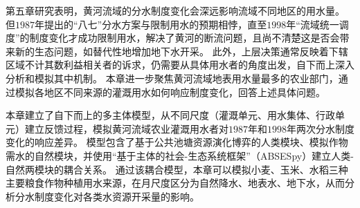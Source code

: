 第五章研究表明，黄河流域的分水制度变化会深远影响流域不同地区的用水量。
但$1987$年提出的“八七”分水方案与限制用水的预期相悖，直至$1998$年“流域统一调度”的制度变化才成功限制用水，解决了黄河的断流问题，且尚不清楚这是否会带来新的生态问题，如替代性地增加地下水开采。
此外，上层决策通常反映着下辖区域不计其数利益相关者的诉求，仍需要从具体用水者的角度出发，自下而上深入分析和模拟其中机制。
本章进一步聚焦黄河流域地表用水量最多的农业部门，通过模拟各地区不同来源的灌溉用水如何响应制度变化，回答上述具体问题。

本章建立了自下而上的多主体模型，从不同尺度（灌溉单元、用水集体、行政单元）建立反馈过程，模拟黄河流域农业灌溉用水者对$1987$年和$1998$年两次分水制度变化的响应差异。
模型包含了基于公共池塘资源演化博弈的人类模块、模拟作物需水的自然模块，并使用“基于主体的社会-生态系统框架”（ABSESpy）建立人类-自然两模块的耦合关系。
通过该耦合模型，本章可以模拟小麦、玉米、水稻三种主要粮食作物种植用水来源，在月尺度区分为自然降水、地表水、地下水，从而分析分水制度变化对各类水资源开采量的影响。
